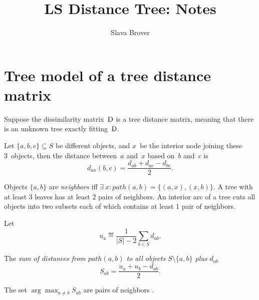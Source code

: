 \documentclass[10pt,a4paper]{article}
\title{LS Distance Tree: Notes}
\author{Slava Brover}
\theoremstyle{plain} \newtheorem{Lem}{Lemma}
\begin{document}
\maketitle

\tableofcontents


\section{Tree model of a tree distance matrix} \label{treeDist2treeModel}

Suppose the dissimilarity matrix~$\mathrm D$ is a tree distance matrix,
meaning that there is an unknown tree exactly fitting~$\mathrm D$.  %

Let $\{a,b,c\} \subseteq S$ be different objects,
and $x$~be the interior node joining these 3~objects,
then the distance between~$a$ and~$x$ based on~$b$ and~$c$ is
$$ d_{ax}(b,c) = \frac {d_{ab} + d_{ac} - d_{bc}} 2. $$

Objects $\{a,b\}$ are {\em neighbors} iff $\exists \ x : path(a,b) = \{(a,x),(x,b)\}$.
A tree with at least 3 leaves has at least 2 pairs of neighbors.
An interior arc of a tree cuts all objects into two subsets each of which contains at least 1 pair of neighbors.

Let
$$ u_a \eqdef \frac 1 {|S| - 2} \sum_{b \in S} d_{ab}. $$

The {\em sum of distances from $path(a,b)$ to all objects $S \setminus \{a,b\}$ plus $d_{ab}$}
$$ S_{ab} = \frac {u_a + u_b - d_{ab}} 2. $$

The set $\arg \max_{a \ne b} S_{ab}$ are pairs of neighbors
\cite{Keppler}.

\end{document}
